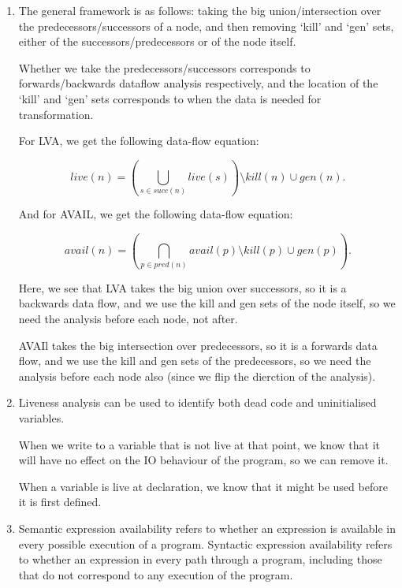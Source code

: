 


\begin{enumerate}[label=(\alph*)]
  \item
    The general framework is as follows: taking the big union/intersection over the predecessors/successors of a node, and then removing `kill' and `gen' sets, either of the successors/predecessors or of the node itself.

    Whether we take the predecessors/successors corresponds to forwards/backwards dataflow analysis respectively, and the location of the `kill' and `gen' sets corresponds to when the data is needed for transformation.

    For LVA, we get the following data-flow equation:

    \[
      live(n) = \left(\bigcup_{s \in succ(n)} live(s)\right) \setminus kill(n) \cup gen(n)
    .\] 

    And for AVAIL, we get the following data-flow equation:

    \[
      avail(n) = \left(\bigcap_{p \in pred(n)} avail(p) \setminus kill(p) \cup gen(p) \right)
    .\] 

    Here, we see that LVA takes the big union over successors, so it is a backwards data flow, and we use the kill and gen sets of the node itself, so we need the analysis before each node, not after.

    AVAIl takes the big intersection over predecessors, so it is a forwards data flow, and we use the kill and gen sets of the predecessors, so we need the analysis before each node also (since we flip the dierction of the analysis).

  \item
    Liveness analysis can be used to identify both dead code and uninitialised variables.

    When we write to a variable that is not live at that point, we know that it will have no effect on the IO behaviour of the program, so we can remove it.

    When a variable is live at declaration, we know that it might be used before it is first defined.

  \item
    Semantic expression availability refers to whether an expression is available in every possible execution of a program. Syntactic expression availability refers to whether an expression in every path through a program, including those that do not correspond to any execution of the program.


\end{enumerate}
